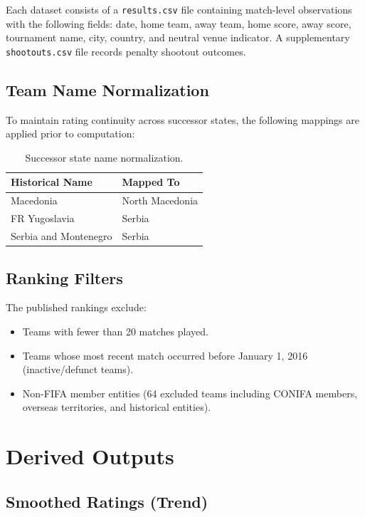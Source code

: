 \documentclass[11pt]{article}
\begin{document}
Each dataset consists of a \texttt{results.csv} file containing match-level observations with the following fields: date, home team, away team, home score, away score, tournament name, city, country, and neutral venue indicator. A supplementary \texttt{shootouts.csv} file records penalty shootout outcomes.

\subsection{Team Name Normalization}

To maintain rating continuity across successor states, the following mappings are applied prior to computation:

\begin{table}[h]
\centering
\begin{tabular}{@{}ll@{}}
\toprule
Historical Name & Mapped To \\
\midrule
Macedonia & North Macedonia \\
FR Yugoslavia & Serbia \\
Serbia and Montenegro & Serbia \\
\bottomrule
\end{tabular}
\caption{Successor state name normalization.}
\end{table}

\subsection{Ranking Filters}

The published rankings exclude:
\begin{itemize}[nosep]
    \item Teams with fewer than 20 matches played.
    \item Teams whose most recent match occurred before January 1, 2016 (inactive/defunct teams).
    \item Non-FIFA member entities (64 excluded teams including CONIFA members, overseas territories, and historical entities).
\end{itemize}

\section{Derived Outputs}

\subsection{Smoothed Ratings (Trend)}
\end{document}
